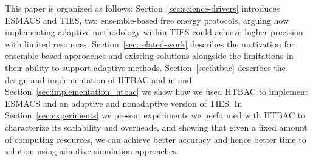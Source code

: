 This paper is organized as follows: Section~\ref{sec:science-drivers}
introduces ESMACS and TIES, two ensemble-based free energy protocols, arguing
how implementing adaptive methodology within TIES could achieve higher
precision with limited resources. Section~\ref{sec:related-work} describes
the motivation for ensemble-based approaches and existing solutions alongside
the limitations in their ability to support adaptive methods.
Section~\ref{sec:htbac} describes the design and implementation of HTBAC and
in and Section~\ref{sec:implementation_htbac} we show how we used HTBAC to
implement ESMACS and an adaptive and nonadaptive version of TIES. In
Section~\ref{sec:experiments} we present experiments we performed with HTBAC
to characterize its scalability and overheads, and showing that given a fixed
amount of computing resources, we can achieve better accuracy and hence
better time to solution using adaptive simulation approaches.






